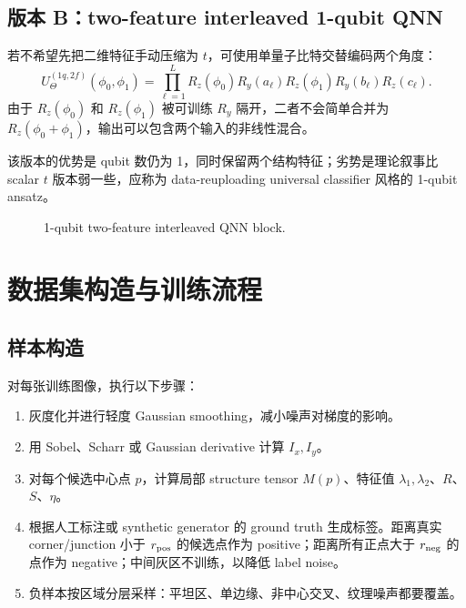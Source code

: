 \documentclass[UTF8,zihao=-4]{ctexart}
\begin{document}
\subsection{版本 B：two-feature interleaved 1-qubit QNN}

若不希望先把二维特征手动压缩为 $t$，可使用单量子比特交替编码两个角度：
\begin{equation}
    U^{(1q,2f)}_\Theta(\phi_0,\phi_1)
    =\prod_{\ell=1}^{L}
    R_z(\phi_0)R_y(a_\ell)R_z(\phi_1)R_y(b_\ell)R_z(c_\ell).
\end{equation}
由于 $R_z(\phi_0)$ 和 $R_z(\phi_1)$ 被可训练 $R_y$ 隔开，二者不会简单合并为 $R_z(\phi_0+\phi_1)$，输出可以包含两个输入的非线性混合。

该版本的优势是 qubit 数仍为 1，同时保留两个结构特征；劣势是理论叙事比 scalar $t$ 版本弱一些，应称为 data-reuploading universal classifier 风格的 1-qubit ansatz。

\begin{figure}[H]
\centering
{}
\caption{1-qubit two-feature interleaved QNN block.}
\end{figure}

\section{数据集构造与训练流程}

\subsection{样本构造}

对每张训练图像，执行以下步骤：
\begin{enumerate}[leftmargin=2.0em]
    \item 灰度化并进行轻度 Gaussian smoothing，减小噪声对梯度的影响。
    \item 用 Sobel、Scharr 或 Gaussian derivative 计算 $I_x,I_y$。
    \item 对每个候选中心点 $p$，计算局部 structure tensor $M(p)$、特征值 $\lambda_1,\lambda_2$、$R$、$S$、$\eta$。
    \item 根据人工标注或 synthetic generator 的 ground truth 生成标签。距离真实 corner/junction 小于 $r_{\rm pos}$ 的候选点作为 positive；距离所有正点大于 $r_{\rm neg}$ 的点作为 negative；中间灰区不训练，以降低 label noise。
    \item 负样本按区域分层采样：平坦区、单边缘、非中心交叉、纹理噪声都要覆盖。
\end{enumerate}
\end{document}
